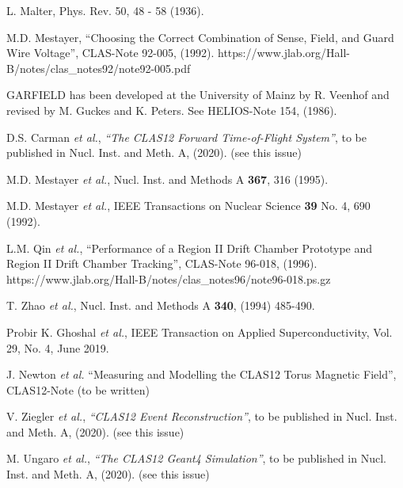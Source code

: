 \begin{thebibliography}{99}
L. Malter, Phys. Rev. 50, 48 - 58 (1936).

M.D. Mestayer, ``Choosing the Correct Combination of Sense, Field, and Guard Wire Voltage'', CLAS-Note 
92-005, (1992). https://www.jlab.org/Hall-B/notes/clas\_notes92/note92-005.pdf

GARFIELD has been developed at the University of Mainz by R. Veenhof and
revised by M. Guckes and K. Peters.  See HELIOS-Note 154, (1986).

D.S. Carman {\it et al.}, {\it ``The CLAS12 Forward Time-of-Flight System''}, to be published in Nucl. Inst.
and Meth. A, (2020). (see this issue)

M.D. Mestayer {\it et al.}, Nucl. Inst. and Methods A {\bf 367}, 316 (1995).

M.D. Mestayer {\it et al.}, IEEE Transactions on Nuclear Science {\bf 39} No. 4, 690 (1992).

L.M. Qin {\it et al.}, ``Performance of a Region II Drift Chamber Prototype and Region II Drift
Chamber Tracking'', CLAS-Note 96-018, (1996).
https://www.jlab.org/Hall-B/notes/clas\_notes96/note96-018.ps.gz

T. Zhao {\it et al.}, Nucl. Inst. and Methods A {\bf 340}, (1994) 485-490.


Probir K. Ghoshal {\it et al.}, IEEE Transaction on Applied Superconductivity, Vol. 29, No. 4, June 2019.

J. Newton {\it et al.} ``Measuring and Modelling the CLAS12 Torus Magnetic Field'', CLAS12-Note (to be written)

V. Ziegler {\it et al.}, {\it ``CLAS12 Event Reconstruction''}, to be published in Nucl. Inst.
and Meth. A, (2020). (see this issue)

M. Ungaro {\it et al.}, {\it ``The CLAS12 Geant4 Simulation''}, to be published in Nucl. Inst.
and Meth. A, (2020). (see this issue)

\end{thebibliography}

